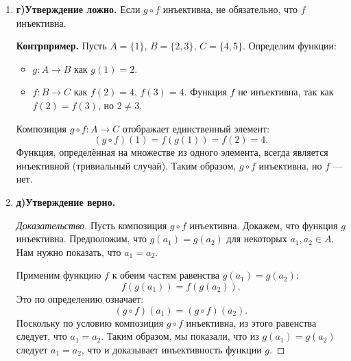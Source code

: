 \documentclass[12pt]{article}
\begin{document}
\begin{enumerate}[label=(\asbuk*)]
\begin{proof}[Доказательство]
    1. \textbf{Инъективность.} Пусть $f$ и $g$ инъективны. Докажем, что $g \circ f$ инъективна.
    Пусть $(g \circ f)(a_1) = (g \circ f)(a_2)$ для некоторых $a_1, a_2 \in A$.
    По определению композиции, $f(g(a_1)) = f(g(a_2))$.
    Поскольку $f$ инъективна, из $f(y_1) = f(y_2)$ следует $y_1=y_2$. В нашем случае $g(a_1) = g(a_2)$.
    Поскольку $g$ инъективна, из $g(a_1) = g(a_2)$ следует $a_1 = a_2$.
    Следовательно, $g \circ f$ инъективна.
    
    2. \textbf{Сюръективность.} Как доказано в пункте (б), если $f$ и $g$ сюръективны, то их композиция $g \circ f$ также сюръективна.
    
    Поскольку композиция $g \circ f$ является и инъективной, и сюръективной, она является биекцией.
    \end{proof}
    

    \item \textbf{г)Утверждение ложно.} Если $g \circ f$ инъективна, не обязательно, что $f$ инъективна.
    
    \textbf{Контрпример.}
    Пусть $A = \{1\}$, $B = \{2, 3\}$, $C = \{4, 5\}$.
    Определим функции:
    \begin{itemize}
        \item $g \colon A \to B$ как $g(1) = 2$.
        \item $f \colon B \to C$ как $f(2) = 4$, $f(3) = 4$. Функция $f$ не инъективна, так как $f(2) = f(3)$, но $2 \neq 3$.
    \end{itemize}
    Композиция $g \circ f \colon A \to C$ отображает единственный элемент:
    \[ (g \circ f)(1) = f(g(1)) = f(2) = 4. \]
    Функция, определённая на множестве из одного элемента, всегда является инъективной (тривиальный случай). Таким образом, $g \circ f$ инъективна, но $f$ — нет.
    
    \item \textbf{д)Утверждение верно.}
    
    \begin{proof}[Доказательство]
    Пусть композиция $g \circ f$ инъективна. Докажем, что функция $g$ инъективна.
    Предположим, что $g(a_1) = g(a_2)$ для некоторых $a_1, a_2 \in A$. Нам нужно показать, что $a_1 = a_2$.
    
    Применим функцию $f$ к обеим частям равенства $g(a_1) = g(a_2)$:
    \[ f(g(a_1)) = f(g(a_2)). \]
    Это по определению означает:
    \[ (g \circ f)(a_1) = (g \circ f)(a_2). \]
    Поскольку по условию композиция $g \circ f$ инъективна, из этого равенства следует, что $a_1 = a_2$.
    Таким образом, мы показали, что из $g(a_1) = g(a_2)$ следует $a_1 = a_2$, что и доказывает инъективность функции $g$.
    \end{proof}
    

\end{enumerate}
\end{document}
